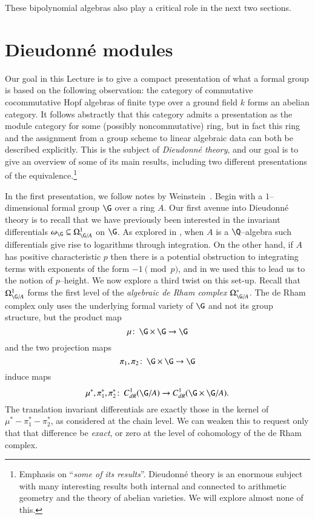 These bipolynomial algebras also play a critical role in the next two sections.










\section{Dieudonn\'e modules}\label{SectionDieudonneModules}

Our goal in this Lecture is to give a compact presentation of what a formal group is based on the following observation: the category of commutative cocommutative Hopf algebras of finite type over a ground field $k$ forms an abelian category.  It follows abstractly that this category admits a presentation as the module category for some (possibly noncommutative) ring, but in fact this ring and the assignment from a group scheme to linear algebraic data can both be described explicitly.  This is the subject of \textit{Dieudonn\'e theory}, and our goal is to give an overview of some of its main results, including two different presentations of the equivalence.\footnote{Emphasis on ``\emph{some of its results}''.  Dieudonn\'e theory is an enormous subject with many interesting results both internal and connected to arithmetic geometry and the theory of abelian varieties.  We will explore almost none of this.}

In the first presentation, we follow notes by Weinstein~\cite[Lecture 1]{Weinstein}.  Begin with a $1$--dimensional formal group $\G$ over a ring $A$.  Our first avenue into Dieudonn\'e theory is to recall that we have previously been interested in the invariant differentials $\omega_{\G} \subseteq \Omega^1_{\G/A}$ on $\G$.  As explored in , when $A$ is a $\Q$--algebra such differentials give rise to logarithms through integration.  On the other hand, if $A$ has positive characteristic $p$ then there is a potential obstruction to integrating terms with exponents of the form $-1 \pmod p$, and in  we used this to lead us to the notion of $p$--height.  We now explore a third twist on this set-up.  Recall that $\Omega^1_{\G/A}$ forms the first level of the \textit{algebraic de Rham complex} $\Omega^*_{\G/A}$.  The de Rham complex only uses the underlying formal variety of $\G$ and not its group structure, but the product map \[\mu\co \G \times \G \to \G\] and the two projection maps \[\pi_1, \pi_2\co \G \times \G \to \G\] induce maps \[\mu^*, \pi_1^*, \pi_2^*\co C_{dR}^1(\G/A) \to C_{dR}^1(\G \times \G / A).\]  The translation invariant differentials are exactly those in the kernel of $\mu^* - \pi_1^* - \pi_2^*$, as considered at the chain level.  We can weaken this to request only that that difference be \emph{exact}, or zero at the level of cohomology of the de Rham complex.

